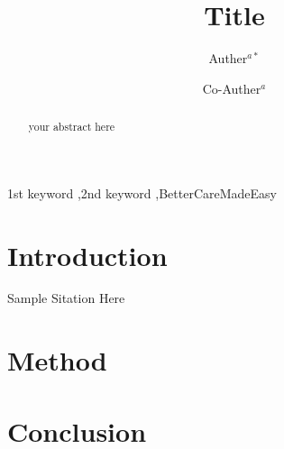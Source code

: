\documentclass[review,authoryear]{elsarticle}
\begin{document}
\begin{frontmatter}
	\title{Title}
	\author{Auther$^{a*}$}
	\author{Co-Auther$^{a}$}
	\address{$^{a}$AGRAN LLC}
	
	
	\begin{abstract}
		your abstract here
	\end{abstract}
	\begin{keyword}
		1st keyword \sep 2nd keyword  \sep BetterCareMadeEasy
	\end{keyword}
\end{frontmatter}
	

\section{Introduction}
 Sample Sitation Here\citep{mbj2012}
\section{Method}
\section{Conclusion}


\newpage


\end{document}
